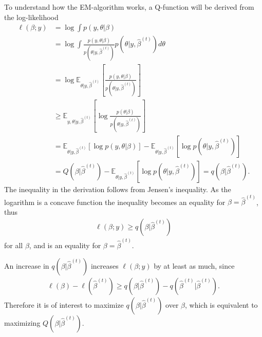 To understand how the EM-algorithm works, a Q-function will be derived from the log-likelihood
\begin{align*}
    \ell (\beta; y) &= \log \int p(y,\theta | \beta)\\
    &= \log \int \frac{p(y,\theta|\beta)}{p(\theta|y,\hat{\beta}^{(t)})}p(\theta|y,\hat{\beta}^{(t)}) d\theta\\
    &=\log \mathbb{E}_{\theta| y, \hat{\beta}^{(t)}}\left[{\frac{p(y,\theta|\beta)}{p(\theta|y,\hat{\beta}^{(t)})}}\right]\\
    &\geq \mathbb{E}_{y,\theta| y, \hat{\beta}^{(t)}}\left[{\log\frac{p(\theta|\beta)}{p(\theta|y,\hat{\beta}^{(t)})}}\right] \\
    &=\mathbb{E}_{\theta| y, \hat{\beta}^{(t)}}\left[\log p(y,\theta| \beta) \right] - \mathbb{E}_{\theta| y, \hat{\beta}^{(t)}}\left[\log p(\theta| y, \hat{\beta}^{(t)}) \right]\\
    &= Q(\beta | \hat{\beta}^{(t)}) - \mathbb{E}_{\theta| y, \hat{\beta}^{(t)}}\left[\log p(\theta| y, \hat{\beta}^{(t)}) \right] = q(\beta | \hat{\beta}^{(t)}).
\end{align*}
The inequality in the derivation follows from Jensen's inequality. As the logarithm is a concave function the inequality becomes an equality for $\beta = \hat{\beta}^{(t)}$, thus
\begin{align*}
    \ell(\beta; y) \geq q(\beta| \hat{\beta}^{(t)})
\end{align*}
for all $\beta$, and is an equality for $\beta = \hat{\beta}^{(t)}$. 

An increase in $q(\beta | \hat{\beta}^{(t)})$ increases $\ell(\beta ; y)$ by at least as much, since
\begin{align*}
    \ell(\beta) - \ell(\hat{\beta}^{(t)}) \geq q(\beta | \hat{\beta}^{(t)}) - q(\hat{\beta}^{(t)} | \hat{\beta}^{(t)}).
\end{align*}
Therefore it is of interest to maximize $q(\beta | \hat{\beta}^{(t)})$ over $\beta$, which is equivalent to maximizing $Q(\beta | \hat{\beta}^{(t)})$.

